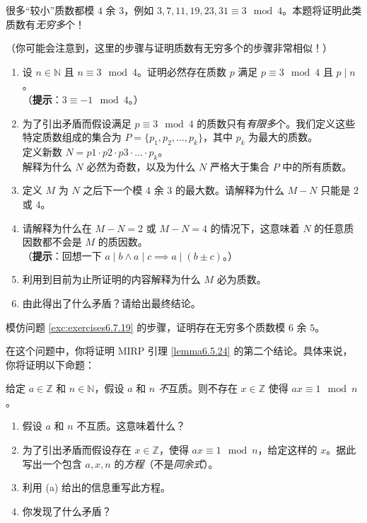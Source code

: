 \begin{exercise}\label{exc:exercises6.7.19}
    \indent 很多``较小''质数都模 $4$ 余 $3$，例如 $3, 7, 11, 19, 23, 31 \equiv 3 \mod 4$。本题将证明此类质数有\emph{无穷多}个！

    （你可能会注意到，这里的步骤与证明质数有无穷多个的步骤非常相似！）
    \begin{enumerate}[label=(\alph*)]
        \item 设 $n \in \mathbb{N}$ 且 $n \equiv 3 \mod 4$。证明必然存在质数 $p$ 满足 $p \equiv 3 \mod 4$ 且 $p \mid n$。\\
        （\textbf{提示}：$3 \equiv -1 \mod 4$。）
        \item 为了引出矛盾而假设满足 $p \equiv 3 \mod 4$ 的质数只有\emph{有限多}个。我们定义这些特定质数组成的集合为 $P = \{p_1, p_2, \dots, p_k\}$，其中 $p_k$ 为最大的质数。\\
        定义新数 $N = p1 \cdot p2 \cdot p3 \cdot \dots \cdot p_k$。\\
        解释为什么 $N$ 必然为奇数，以及为什么 $N$ 严格大于集合 $P$ 中的所有质数。
        \item 定义 $M$ 为 $N$ 之后下一个模 $4$ 余 $3$ 的最大数。请解释为什么 $M - N$ 只能是 $2$ 或 $4$。
        \item 请解释为什么在 $M - N = 2$ 或 $M - N = 4$ 的情况下，这意味着 $N$ 的任意质因数都不会是 $M$ 的质因数。\\
        （\textbf{提示}：回想一下 $a \mid b \land a \mid c \implies a \mid (b \pm c)$。）
        \item 利用到目前为止所证明的内容解释为什么 $M$ 必为质数。
        \item 由此得出了什么矛盾？请给出最终结论。
    \end{enumerate}
\end{exercise}

\begin{exercise}
    模仿问题 \ref{exc:exercises6.7.19} 的步骤，证明存在无穷多个质数模 $6$ 余 $5$。
\end{exercise}

\begin{exercise}\label{exc:exercises6.7.21}
    在这个问题中，你将证明 MIRP 引理 \ref{lemma6.5.24} 的第二个结论。具体来说，你将证明以下命题：
    \begin{center}
        给定 $a \in \mathbb{Z}$ 和 $n \in \mathbb{N}$，假设 $a$ 和 $n$ \emph{不}互质。则不存在 $x \in \mathbb{Z}$ 使得 $ax \equiv 1 \mod n$。
    \end{center}
    \begin{enumerate}[label=(\alph*)]
        \item 假设 $a$ 和 $n$ 不互质。这意味着什么？
        \item 为了引出矛盾而假设存在 $x \in \mathbb{Z}$，使得 $ax \equiv 1 \mod n$，给定这样的 $x$。据此写出一个包含 $a,x,n$ 的\emph{方程}（不是\emph{同余式}）。
        \item 利用 (a) 给出的信息重写此方程。
        \item 你发现了什么矛盾？
    \end{enumerate}
\end{exercise}

